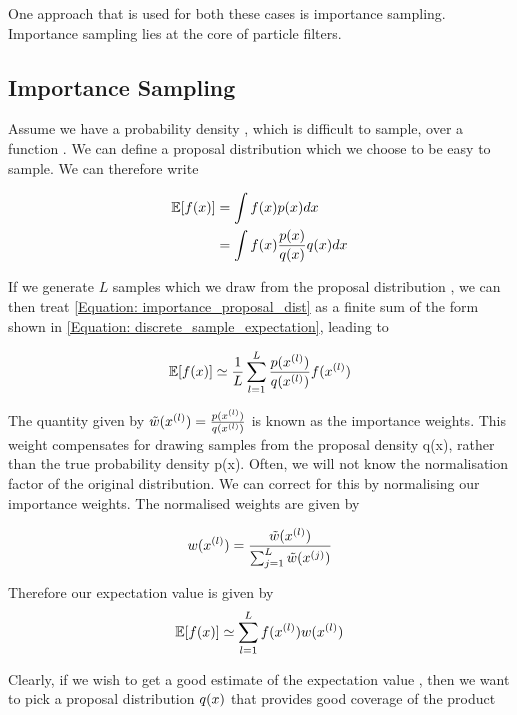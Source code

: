 One approach that is used for both these cases is importance sampling. Importance sampling lies at the core of particle filters.

\subsection{Importance Sampling}

Assume we have a probability density \probx, which is difficult to sample, over a function \funcx.
 We can define a proposal distribution \propx which we choose to be easy to sample. We can therefore write

\begin{align}
\mathbb{E}[f(x)] &= \int f(x)p(x) dx \nonumber \\
		&= \int f(x)\frac{p(x)}{q(x)}q(x) dx \label{Equation: importance_proposal_dist} 
\end{align}

If we generate $L$ samples  which we draw from the proposal distribution \propx, we can then treat \eqref{Equation: importance_proposal_dist} as a finite sum of the form shown in \eqref{Equation: discrete_sample_expectation}, leading to

\begin{equation}
\mathbb{E}[f(x)] \simeq \frac{1}{L} \sum_{l=1}^{L} \frac{p(x^{(l)})}{q(x^{(l)})}f(x^{(l)})
\end{equation}

The quantity given by $\tilde{w}(x^{(l)})=\frac{p(x^{(l)})}{q(x^{(l)})}$ is known as the importance weights. 
This weight compensates for drawing samples from the proposal density q(x), rather than the true probability density p(x). 
Often, we will not know the normalisation factor of the original distribution. 
We can correct for this by normalising our importance weights. 
The normalised weights are given by

\begin{equation}
w(x^{(l)})= \frac{\tilde{w}(x^{(l)})}{\sum^{L}_{j=1} \tilde{w}(x^{(j)})}
\end{equation}

Therefore our expectation value is given by
\begin{equation}
\mathbb{E}[f(x)]\simeq \sum\limits_{l=1}^{L} f(x^{(l)})w(x^{(l)})
\end{equation}

Clearly, if we wish to get a good estimate of the expectation value \expectation{\funcx}, then we want to pick a proposal distribution $q(x)$ that provides good coverage of the product \funcx\probx

